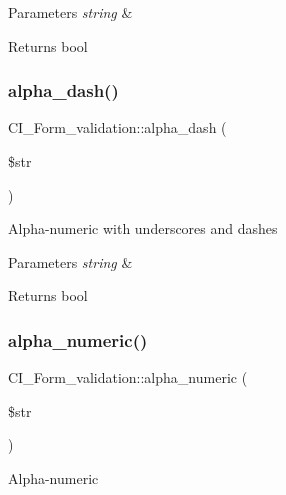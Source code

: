 \begin{DoxyParams}{Parameters}
{\em string} & \\
\hline
\end{DoxyParams}
\begin{DoxyReturn}{Returns}
bool 
\end{DoxyReturn}
\mbox{\label{class_c_i___form__validation_a648f10fb78071945e641e3230bdf2a77}} 
\subsubsection{\texorpdfstring{alpha\+\_\+dash()}{alpha\_dash()}}
{\footnotesize\ttfamily C\+I\+\_\+\+Form\+\_\+validation\+::alpha\+\_\+dash (\begin{DoxyParamCaption}\item[{}]{\$str }\end{DoxyParamCaption})}

Alpha-\/numeric with underscores and dashes


\begin{DoxyParams}{Parameters}
{\em string} & \\
\hline
\end{DoxyParams}
\begin{DoxyReturn}{Returns}
bool 
\end{DoxyReturn}
\mbox{\label{class_c_i___form__validation_abc9704781aa812eb05ab7dcc26f2f497}} 
\subsubsection{\texorpdfstring{alpha\+\_\+numeric()}{alpha\_numeric()}}
{\footnotesize\ttfamily C\+I\+\_\+\+Form\+\_\+validation\+::alpha\+\_\+numeric (\begin{DoxyParamCaption}\item[{}]{\$str }\end{DoxyParamCaption})}

Alpha-\/numeric



